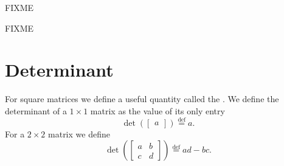 FIXME

\setcounter{exercise}{100}

FIXME


\sectionnewpage
\section{Determinant}
\label{det:section}


For square matrices we define a useful quantity called the
\emph{}.  We define
the determinant of a $1 \times 1$ matrix as the value of its only entry
\begin{equation*}
\det \left(
\begin{bmatrix}
a 
\end{bmatrix}
\right)
\overset{\text{def}}{=}
a .
\end{equation*}
For a $2 \times 2$ matrix we define
\begin{equation*}
\det \left(
\begin{bmatrix}
a & b \\
c & d
\end{bmatrix}
\right)
\overset{\text{def}}{=}
ad-bc .
\end{equation*}

